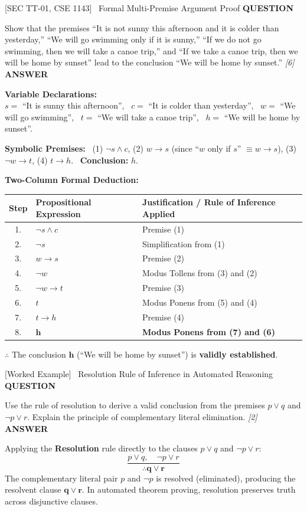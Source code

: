 \documentclass[11pt,a4paper]{article}
\newcommand{\Qlabel}{\textbf{\color{navy}\footnotesize\MakeUppercase{Question}}\par\smallskip}
\newcommand{\Alabel}{\textbf{\color{teal}\footnotesize\MakeUppercase{Answer}}\par\smallskip}
\begin{document}
\begin{exambox}{[SEC TT-01, CSE 1143] \ Formal Multi-Premise Argument Proof}
\Qlabel
Show that the premises ``It is not sunny this afternoon and it is colder than yesterday,'' ``We will go swimming only if it is sunny,'' ``If we do not go swimming, then we will take a canoe trip,'' and ``If we take a canoe trip, then we will be home by sunset'' lead to the conclusion ``We will be home by sunset.'' \hfill\textit{[6]}
\tcblower
\Alabel
\textbf{Variable Declarations:}\\
$s =$ ``It is sunny this afternoon'', \ $c =$ ``It is colder than yesterday'', \ $w =$ ``We will go swimming'', \ $t =$ ``We will take a canoe trip'', \ $h =$ ``We will be home by sunset''.

\textbf{Symbolic Premises:} \ (1) $\neg s \wedge c$, \quad (2) $w \rightarrow s$ (since ``$w$ only if $s$'' $\equiv w \to s$), \quad (3) $\neg w \rightarrow t$, \quad (4) $t \rightarrow h$. \ \textbf{Conclusion:} $h$.

\textbf{Two-Column Formal Deduction:}
\begin{center}
\renewcommand{\arraystretch}{1.15}
\small
\begin{tabularx}{0.95\linewidth}{@{}c l X@{}}
\toprule
\textbf{Step} & \textbf{Propositional Expression} & \textbf{Justification / Rule of Inference Applied} \\
\midrule
1. & $\neg s \wedge c$ & Premise (1) \\
2. & $\neg s$ & Simplification from (1) \\
3. & $w \rightarrow s$ & Premise (2) \\
4. & $\neg w$ & Modus Tollens from (3) and (2) \\
5. & $\neg w \rightarrow t$ & Premise (3) \\
6. & $t$ & Modus Ponens from (5) and (4) \\
7. & $t \rightarrow h$ & Premise (4) \\
8. & $\mathbf{h}$ & \textbf{Modus Ponens from (7) and (6)} \\
\bottomrule
\end{tabularx}
\end{center}
$\therefore$ The conclusion $\mathbf{h}$ (``We will be home by sunset'') is \textbf{validly established}. \quad [Q.E.D.]
\end{exambox}

\begin{exambox}{[Worked Example] \ Resolution Rule of Inference in Automated Reasoning}
\Qlabel
Use the rule of resolution to derive a valid conclusion from the premises $p \vee q$ and $\neg p \vee r$. Explain the principle of complementary literal elimination. \hfill\textit{[2]}
\tcblower
\Alabel
Applying the \textbf{Resolution} rule directly to the clauses $p \vee q$ and $\neg p \vee r$:
\[
\frac{p \vee q, \quad \neg p \vee r}{\therefore \mathbf{q \vee r}}
\]
The complementary literal pair $p$ and $\neg p$ is resolved (eliminated), producing the resolvent clause $\mathbf{q \vee r}$. In automated theorem proving, resolution preserves truth across disjunctive clauses.
\end{exambox}
\end{document}
